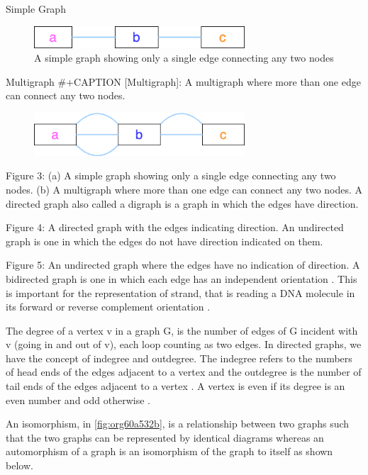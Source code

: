\documentclass[10pt, a4paper]{article}
\begin{document}
Simple Graph
\begin{figure}
\centering
\includegraphics[width=0.7\textwidth]{figures/Graph-classifications-Simple-Graph.png}
\caption[Simple Graph]{\label{fig:org978c290}
A simple graph showing only a single edge connecting any two nodes}
\end{figure}


Multigraph
\#+CAPTION [Multigraph]: A multigraph where more than one edge can connect any two nodes.
\begin{figure}
\centering
\includegraphics[width=0.7\textwidth]{figures/Graph-classifications-Multigraph.png}
\label{org538d5ac}
\end{figure}


Figure 3: (a) A simple graph showing only a single edge connecting any two
nodes. (b) A multigraph where more than one edge can connect any two nodes.
A directed graph also called a digraph is a graph in which the edges have
direction.

Figure 4: A directed graph with the edges indicating direction.
An undirected graph is one in which the edges do not have direction indicated on
them.

Figure 5: An undirected graph where the edges have no indication of direction.
A bidirected graph is one in which each edge has an independent orientation
\cite{edmondsMatchingWellSolvedClass2003}.
This is important for the representation of strand, that is reading a DNA
molecule in its forward or reverse complement orientation 
\cite{patenGenomeGraphsEvolution2017}.

The degree of a vertex v in a graph G, is the number of edges of G incident with
v (going in and out of v), each loop counting as two edges. In directed graphs,
we have the concept of indegree and outdegree. The indegree refers to the
numbers of head ends of the edges adjacent to a vertex and the outdegree is the
number of tail ends of the edges adjacent to a vertex \cite{bondyGraphTheory2011}.
A vertex is even if its degree is an even number and odd otherwise
\cite{trudeauIntroductionGraphTheory1993}.

An isomorphism, in \ref{fig:org60a532b}, is a relationship between two graphs such that the two graphs
can be represented by identical diagrams \cite{bondyGraphTheory2011} whereas an 
automorphism of a graph is an isomorphism of the graph to itself as shown below.
\end{document}

